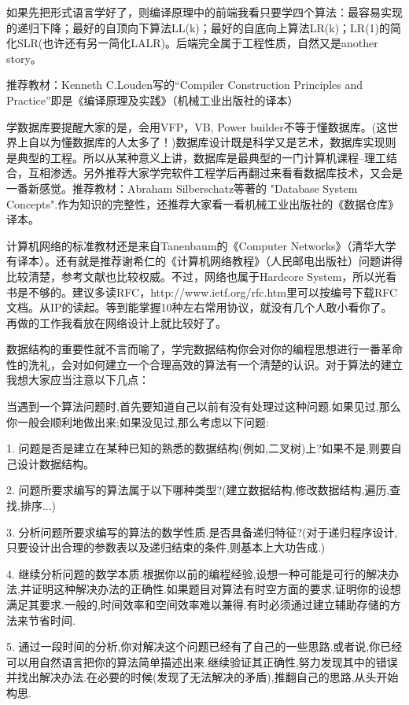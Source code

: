 如果先把形式语言学好了，则编译原理中的前端我看只要学四个算法：最容易实现的递归下降；最好的自顶向下算法LL(k)；最好的自底向上算法LR(k)；LR(1)的简化SLR(也许还有另一简化LALR)。后端完全属于工程性质，自然又是another story。


推荐教材：Kenneth C.Louden写的“Compiler Construction Principles and Practice”即是《编译原理及实践》（机械工业出版社的译本）


学数据库要提醒大家的是，会用VFP，VB, Power builder不等于懂数据库。(这世界上自以为懂数据库的人太多了！)数据库设计既是科学又是艺术，数据库实现则是典型的工程。所以从某种意义上讲，数据库是最典型的一门计算机课程--理工结合，互相渗透。另外推荐大家学完软件工程学后再翻过来看看数据库技术，又会是一番新感觉。推荐教材：Abraham Silberschatz等著的 "Database System Concepts".作为知识的完整性，还推荐大家看一看机械工业出版社的《数据仓库》译本。


计算机网络的标准教材还是来自Tanenbaum的《Computer Networks》（清华大学有译本）。还有就是推荐谢希仁的《计算机网络教程》（人民邮电出版社）问题讲得比较清楚，参考文献也比较权威。不过，网络也属于Hardcore System，所以光看书是不够的。建议多读RFC，http://www.ietf.org/rfc.htm里可以按编号下载RFC文档。从IP的读起。等到能掌握10种左右常用协议，就没有几个人敢小看你了。再做的工作我看放在网络设计上就比较好了。


数据结构的重要性就不言而喻了，学完数据结构你会对你的编程思想进行一番革命性的洗礼，会对如何建立一个合理高效的算法有一个清楚的认识。对于算法的建立我想大家应当注意以下几点：


当遇到一个算法问题时,首先要知道自己以前有没有处理过这种问题.如果见过,那么你一般会顺利地做出来;如果没见过,那么考虑以下问题:

1. 问题是否是建立在某种已知的熟悉的数据结构(例如,二叉树)上?如果不是,则要自己设计数据结构。

2. 问题所要求编写的算法属于以下哪种类型?(建立数据结构,修改数据结构,遍历,查找,排序...)

3. 分析问题所要求编写的算法的数学性质.是否具备递归特征?(对于递归程序设计,只要设计出合理的参数表以及递归结束的条件,则基本上大功告成.)

4. 继续分析问题的数学本质.根据你以前的编程经验,设想一种可能是可行的解决办法,并证明这种解决办法的正确性.如果题目对算法有时空方面的要求,证明你的设想满足其要求.一般的,时间效率和空间效率难以兼得.有时必须通过建立辅助存储的方法来节省时间.

5. 通过一段时间的分析,你对解决这个问题已经有了自己的一些思路.或者说,你已经可以用自然语言把你的算法简单描述出来.继续验证其正确性,努力发现其中的错误并找出解决办法.在必要的时候(发现了无法解决的矛盾),推翻自己的思路,从头开始构思.


